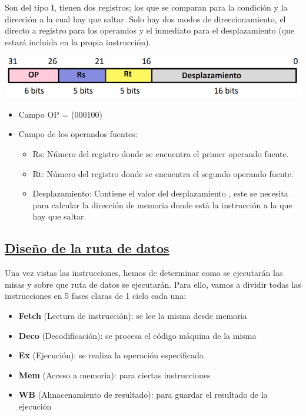 \documentclass[a4paper,10pt]{book}
\begin{document}
Son del tipo I, tienen dos registros; los que se comparan para la condición y la dirección a la cual hay que saltar. Solo hay dos modos de direccionamiento, el directo a registro para los operandos y el inmediato para el desplazamiento (que estará incluida en la propia instrucción).
\begin{center}
\includegraphics[scale=0.6]{instrucciones salto condicional}
\end{center}
\begin{itemize}
\item Campo OP = (000100)
\item Campo de los operandos fuentes: 
	\begin{itemize}
	\item Rs: Número del registro donde se encuentra el primer operando fuente.
	\item Rt: Número del registro donde se encuentra el segundo operando fuente.
	\item Desplazamiento: Contiene el valor del desplazamiento , este se necesita para calcular la dirección de memoria donde está la instrucción a la que hay que saltar.
	\end{itemize}
\end{itemize}

\subsection*{\underline{Diseño de la ruta de datos}}
Una vez vistas las instrucciones, hemos de determinar como se ejecutarán las misas y sobre que ruta de datos se ejecutarán. Para ello, vamos a dividir todas las instrucciones en 5 fases claras de 1 ciclo cada una:
\begin{itemize}
\item \textbf{Fetch} (Lectura de instrucción): se lee la misma desde memoria
\item \textbf{Deco} (Decodificación): se procesa el código máquina de la misma
\item \textbf{Ex} (Ejecución): se realiza la operación especificada
\item \textbf{Mem} (Acceso a memoria): para ciertas instrucciones
\item \textbf{WB} (Almacenamiento de resultado): para guardar el resultado de la ejecución
\end{itemize}
\end{document}
